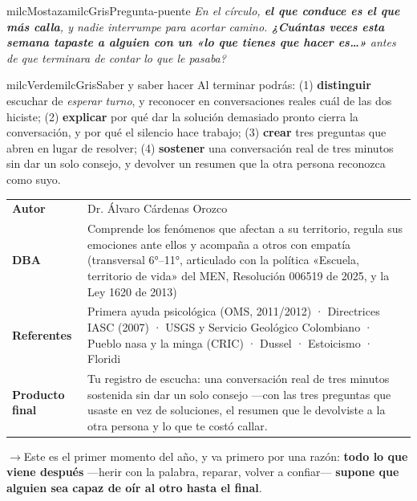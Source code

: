 \documentclass[11pt,letterpaper]{article}
\newcommand{\puente}[1]{%
  \begin{puentebox}%
    \textcolor{milcGradeDark}{$\rightarrow$}\hspace{2mm}#1%
  \end{puentebox}%
}
\begin{document}
\begin{softbox}{milcMostaza}{milcGris}{Pregunta-puente}
\textit{En el círculo, \textbf{el que conduce es el que más calla}, y nadie interrumpe para acortar camino. \textbf{¿Cuántas veces esta semana tapaste a alguien con un «lo que tienes que hacer es\ldots»} antes de que terminara de contar lo que le pasaba?}
\end{softbox}

\begin{softbox}{milcVerde}{milcGris}{Saber y saber hacer}
Al terminar podrás: (1) \textbf{distinguir} escuchar de \emph{esperar turno}, y reconocer en conversaciones reales cuál de las dos hiciste; (2) \textbf{explicar} por qué dar la solución demasiado pronto cierra la conversación, y por qué el silencio hace trabajo; (3) \textbf{crear} tres preguntas que abren en lugar de resolver; (4) \textbf{sostener} una conversación real de tres minutos sin dar un solo consejo, y devolver un resumen que la otra persona reconozca como suyo.
\end{softbox}



\small
\begin{tabularx}{\textwidth}{>{\bfseries}p{3.0cm}Y}
Autor & Dr. Álvaro Cárdenas Orozco\\
DBA & Comprende los fenómenos que afectan a su territorio, regula sus emociones ante ellos y acompaña a otros con empatía (transversal 6°--11°, articulado con la política «Escuela, territorio de vida» del MEN, Resolución 006519 de 2025, y la Ley 1620 de 2013)\\
Referentes & Primera ayuda psicológica (OMS, 2011/2012) · Directrices IASC (2007) · USGS y Servicio Geológico Colombiano · Pueblo nasa y la minga (CRIC) · Dussel · Estoicismo · Floridi\\
Producto final & Tu registro de escucha: una conversación real de tres minutos sostenida sin dar un solo consejo —con las tres preguntas que usaste en vez de soluciones, el resumen que le devolviste a la otra persona y lo que te costó callar.\\
\end{tabularx}
\normalsize

\puente{Este es el primer momento del año, y va primero por una razón: \textbf{todo lo que viene después} ---herir con la palabra, reparar, volver a confiar--- \textbf{supone que alguien sea capaz de oír al otro hasta el final}.}
\end{document}

